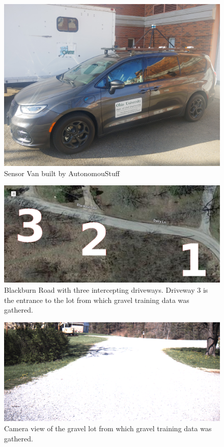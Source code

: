 \documentclass[numbered,pdftex]{ohio-etd}
\begin{document}
{{%
%		
		\begin{figure}[H]
			\centering
			\includegraphics[width=0.7\linewidth]{Defense_Images/van_on_van}
			\caption[Sensor Van]{Sensor Van built by AutonomouStuff}
			\label{fig:Experimental_Apperatus_in_Results}
		\end{figure}
		
		\begin{figure}[H]
			\centering
			\includegraphics[width=0.65\linewidth]{Defense_Images/three_driveways_sat}
			\caption[Blackburn Road Overlays]{Blackburn Road with three intercepting driveways. Driveway $3$ is the entrance to the lot from which gravel training data was gathered. }
			\label{fig:road_areas_annotated_2}
		\end{figure}
		
		\begin{figure}[H]
			\centering
			\includegraphics[width=0.75\linewidth]{Defense_Images/gravel_training_lot}
			\caption[Gravel Training Lot]{Camera view of the gravel lot from which gravel training data was gathered.}
			\label{fig:gravel_training_lot_in_results}
		\end{figure}

}}
\end{document}
